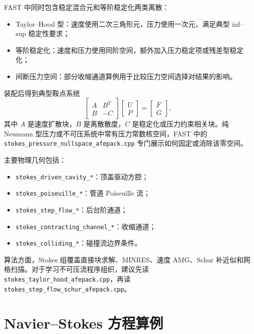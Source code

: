 \documentclass[UTF8,openany,zihao=-4,scheme=chinese]{ctexbook}
\newcommand{\file}[1]{\nolinkurl{#1}}
\begin{document}
FAST 中同时包含稳定混合元和等阶稳定化两类离散：

\begin{itemize}[leftmargin=2em]
  \item Taylor--Hood 型：速度使用二次三角形元，压力使用一次元，满足典型 inf--sup 稳定性要求；
  \item 等阶稳定化：速度和压力使用同阶空间，额外加入压力稳定项或残差型稳定化；
  \item 间断压力空间：部分收缩通道算例用于比较压力空间选择对结果的影响。
\end{itemize}

装配后得到典型鞍点系统
\[
  \begin{bmatrix}
    A & B^T\\
    B & -C
  \end{bmatrix}
  \begin{bmatrix}
    U\\ P
  \end{bmatrix}
  =
  \begin{bmatrix}
    F\\ G
  \end{bmatrix},
\]
其中 $A$ 是速度扩散块，$B$ 是离散散度，$C$ 是稳定化或压力约束相关块。纯 Neumann 型压力或不可压系统中常有压力常数核空间，FAST 中的 \file{stokes\_pressure\_nullspace\_afepack.cpp} 专门展示如何固定或消除该零空间。

主要物理几何包括：

\begin{itemize}[leftmargin=2em]
  \item \file{stokes\_driven\_cavity\_*}：顶盖驱动方腔；
  \item \file{stokes\_poiseuille\_*}：管道 Poiseuille 流；
  \item \file{stokes\_step\_flow\_*}：后台阶通道；
  \item \file{stokes\_contracting\_channel\_*}：收缩通道；
  \item \file{stokes\_colliding\_*}：碰撞流边界条件。
\end{itemize}

算法方面，Stokes 组覆盖直接块求解、MINRES、速度 AMG、Schur 补近似和网格扫描。对于学习不可压流程序组织，建议先读 \file{stokes\_taylor\_hood\_afepack.cpp}，再读 \file{stokes\_step\_flow\_schur\_afepack.cpp}。

\section{Navier--Stokes 方程算例}
\end{document}
